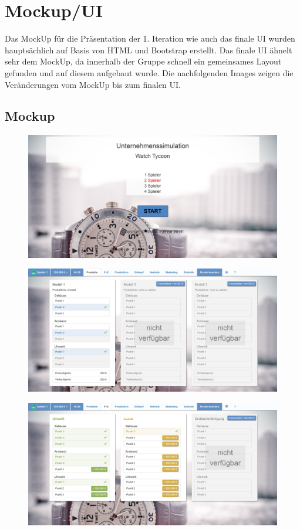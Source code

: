 \chapter{Mockup/UI}
Das MockUp für die Präsentation der 1. Iteration wie auch das finale UI wurden hauptsächlich auf Basis von HTML und Bootstrap erstellt. Das finale UI ähnelt sehr dem MockUp, da innerhalb der Gruppe schnell ein gemeinsames Layout gefunden und auf diesem aufgebaut wurde. Die nachfolgenden Images zeigen die Veränderungen vom MockUp bis zum finalen UI.  
\section{Mockup}
\begin{figure} [h]
	\centering
	\includegraphics[scale=0.1]{img/bilder_layout/MockUp1.jpg} 
\end{figure}
\begin{figure}
	\centering
	\includegraphics[scale=0.1]{img/bilder_layout/MockUp2.jpg} 
\end{figure}
\begin{figure} 
	\centering
	\includegraphics[scale=0.1]{img/bilder_layout/MockUp3.jpg} 
\end{figure}

